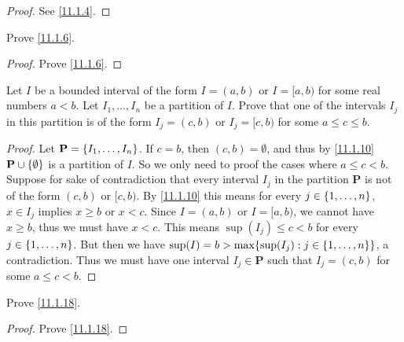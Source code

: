 \begin{proof}
  See \cref{11.1.4}.
\end{proof}

\begin{ex}\label{ex:11.1.2}
  Prove \cref{11.1.6}.
\end{ex}

\begin{proof}
  Prove \cref{11.1.6}.
\end{proof}

\begin{ex}\label{ex:11.1.3}
  Let \(I\) be a bounded interval of the form \(I = (a, b)\) or \(I = [a, b)\) for some real numbers \(a < b\).
  Let \(I_1, \dots, I_n\) be a partition of \(I\).
  Prove that one of the intervals \(I_j\) in this partition is of the form \(I_j = (c, b)\) or \(I_j = [c, b)\) for some \(a \leq c \leq b\).
\end{ex}

\begin{proof}
  Let \(\mathbf{P} = \left\lbrace I_1, \dots, I_n\right\rbrace\).
  If \(c = b\), then \((c, b) = \emptyset\), and thus by \cref{11.1.10} \(\mathbf{P} \cup \left\lbrace\emptyset\right\rbrace\) is a partition of \(I\).
  So we only need to proof the cases where \(a \leq c < b\).
  Suppose for sake of contradiction that every interval \(I_j\) in the partition \(\mathbf{P}\) is not of the form \((c, b)\) or \([c, b)\).
  By \cref{11.1.10} this means for every \(j \in \left\lbrace1, \dots, n\right\rbrace\), \(x \in I_j\) implies \(x \geq b\) or \(x < c\).
  Since \(I = (a, b)\) or \(I = [a, b)\), we cannot have \(x \geq b\), thus we must have \(x < c\).
  This means \(\sup(I_j) \leq c < b\) for every \(j \in \left\lbrace1, \dots, n\right\rbrace\).
  But then we have \(\sup(I) = b > \max\set{\sup(I_j) : j \in \set{1, \dots, n}}\), a contradiction.
  Thus we must have one interval \(I_j \in \mathbf{P}\) such that \(I_j = (c, b)\) for some \(a \leq c < b\).
\end{proof}

\begin{ex}\label{ex:11.1.4}
  Prove \cref{11.1.18}.
\end{ex}

\begin{proof}
  Prove \cref{11.1.18}.
\end{proof}
